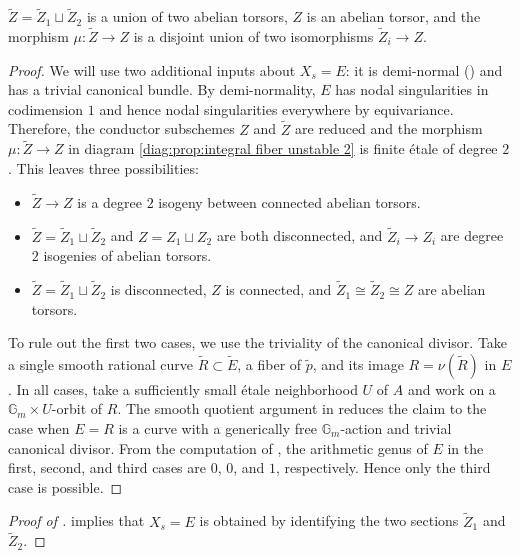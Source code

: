 \documentclass[reqno, letterpaper]{amsart}
\numberwithin{equation}{subsection}
\let\to\longrightarrow
\newcommand{\GG}{\mathbb{G}}
\begin{document}
		\begin{lemma} \label{lem:prop:Weierstrass fiber semistable}
			$\tilde Z = \tilde Z_1 \sqcup \tilde Z_2$ is a union of two abelian torsors, $Z$ is an abelian torsor, and the morphism $\mu : \tilde Z \to Z$ is a disjoint union of two isomorphisms $\tilde Z_i \to Z$.
		\end{lemma}
		\begin{proof}
			We will use two additional inputs about $X_s = E$: it is demi-normal () and has a trivial canonical bundle. By demi-normality, $E$ has nodal singularities in codimension $1$ and hence nodal singularities everywhere by equivariance. Therefore, the conductor subschemes $Z$ and $\tilde Z$ are reduced and the morphism $\mu : \tilde Z \to Z$ in diagram \eqref{diag:prop:integral fiber unstable 2} is finite \'etale of degree $2$. This leaves three possibilities:
			\begin{itemize}
				\item $\tilde Z \to Z$ is a degree $2$ isogeny between connected abelian torsors.
				\item $\tilde Z = \tilde Z_1 \sqcup \tilde Z_2$ and $Z = Z_1 \sqcup Z_2$ are both disconnected, and $\tilde Z_i \to Z_i$ are degree $2$ isogenies of abelian torsors.
				\item $\tilde Z = \tilde Z_1 \sqcup \tilde Z_2$ is disconnected, $Z$ is connected, and $\tilde Z_1 \cong \tilde Z_2 \cong Z$ are abelian torsors.
			\end{itemize}
			
			To rule out the first two cases, we use the triviality of the canonical divisor. Take a single smooth rational curve $\tilde R \subset \tilde E$, a fiber of $\tilde p$, and its image $R = \nu(\tilde R)$ in $E$. In all cases, take a sufficiently small \'etale neighborhood $U$ of $A$ and work on a $\GG_m \times U$-orbit of $R$. The smooth quotient argument in  reduces the claim to the case when $E = R$ is a curve with a generically free $\GG_m$-action and trivial canonical divisor. From the computation of \cite[\S IV.3]{serre:class_field}, the arithmetic genus of $E$ in the first, second, and third cases are $0$, $0$, and $1$, respectively. Hence only the third case is possible.
		\end{proof}
		
		\begin{proof} [Proof of ]
			 implies that $X_s = E$ is obtained by identifying the two sections $\tilde Z_1$ and $\tilde Z_2$.
		\end{proof}
		
\end{document}
